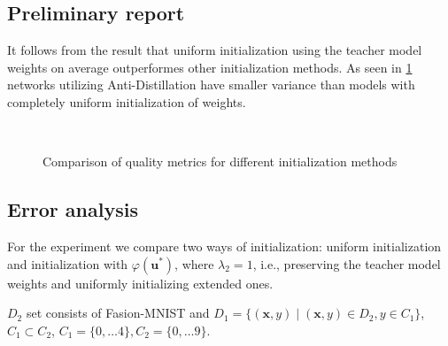 \documentclass[80pt]{article}
\begin{document}
\subsection{Preliminary report}

It follows from the result that uniform initialization using the teacher model weights on average outperformes other initialization methods. As seen in \ref{fig:1} networks utilizing Anti-Distillation have smaller variance than models with completely uniform initialization of weights.

\begin{figure}[!t]
  \\
 \caption{Comparison of quality metrics for different initialization methods}
  \label{fig:1}
\end{figure}

\subsection{Error analysis}

For the experiment we compare two ways of initialization: uniform initialization and initialization with $\varphi(\textbf{u}^*)$, where $\lambda_2 = 1$, i.e., preserving the teacher model weights and uniformly initializing extended ones.

$D_2$ set consists of Fasion-MNIST and $D_1 = \{(\textbf{x}, y) \;|\; (\textbf{x}, y) \in D_2, y \in C_1\}$, $C_1 \subset C_2$, $C_1 = \{0, \dots 4\}, C_2 = \{0, \dots 9\}$. 
\end{document}
